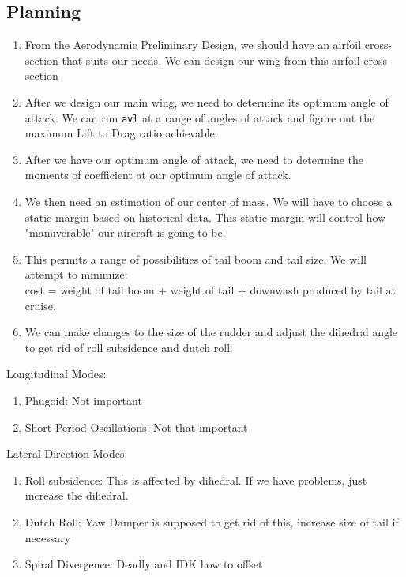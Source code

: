 \subsection{Planning}
\begin{comment}
\end{comment}
\begin{enumerate}
\item From the Aerodynamic Preliminary Design, we should have an airfoil cross-section that suits our needs. We can design our wing from this airfoil-cross section
\item After we design our main wing, we need to determine its optimum angle of attack. We can run \texttt{avl} at a range of angles of attack and figure out the maximum Lift to Drag ratio achievable.
\item After we have our optimum angle of attack, we need to determine the moments of coefficient at our optimum angle of attack.
\item We then need an estimation of our center of mass. We will have to choose a static margin based on historical data. This static margin will control how "manuverable" our aircraft is going to be.
\item This permits a range of possibilities of tail boom and tail size. We will attempt to minimize: 
\\cost = weight of tail boom + weight of tail + downwash produced by tail at cruise.
\item We can make changes to the size of the rudder and adjust the dihedral angle to get rid of roll subsidence and dutch roll.
\end{enumerate}

Longitudinal Modes:
\begin{enumerate}
\item Phugoid: Not important
\item Short Period Oscillations: Not that important
\end{enumerate}

Lateral-Direction Modes:
\begin{enumerate}
\item Roll subsidence: This is affected by dihedral. If we have problems, just increase the dihedral.
\item Dutch Roll: Yaw Damper is supposed to get rid of this, increase size of tail if necessary
\item Spiral Divergence: Deadly and IDK how to offset
\end{enumerate}

